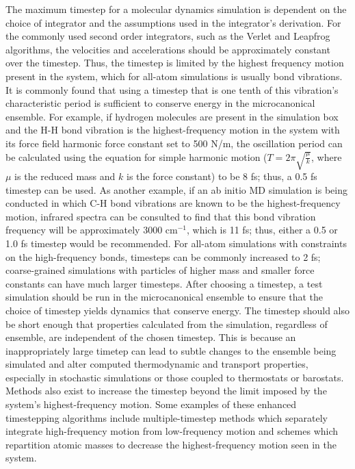 \documentclass[9pt,bestpractices]{livecoms}
\begin{document}
The maximum timestep for a molecular dynamics simulation is dependent on the choice of integrator and the assumptions used in the integrator's derivation.
For the commonly used second order integrators, such as the Verlet and Leapfrog algorithms, the velocities and accelerations should be approximately constant over the timestep.
Thus, the timestep is limited by the highest frequency motion present in the system, which for all-atom simulations is usually bond vibrations.
It is commonly found that using a timestep that is one tenth of this vibration's characteristic period is sufficient to conserve energy in the microcanonical ensemble.
For example, if hydrogen molecules are present in the simulation box and the H-H bond vibration is the highest-frequency motion in the system with its force field harmonic force constant set to 500 N/m, the oscillation period can be calculated using the equation for simple harmonic motion ($T=2\pi\sqrt{\frac{\mu}{k}}$, where $\mu$ is the reduced mass and $k$ is the force constant) to be 8 fs; thus, a 0.5 fs timestep can be used.
As another example, if an ab initio MD simulation is being conducted in which C-H bond vibrations are known to be the highest-frequency motion, infrared spectra can be consulted to find that this bond vibration frequency will be approximately 3000 cm$^{-1}$, which is 11 fs; thus, either a 0.5 or 1.0 fs timestep would be recommended.
For all-atom simulations with constraints on the high-frequency bonds, timesteps can be commonly increased to 2 fs; coarse-grained simulations with particles of higher mass and smaller force constants can have much larger timesteps.
After choosing a timestep, a test simulation should be run in the microcanonical ensemble to ensure that the choice of timestep yields dynamics that conserve energy.
The timestep should also be short enough that properties calculated from the simulation, regardless of ensemble, are independent of the chosen timestep.
This is because an inappropriately large timetep can lead to subtle changes to the ensemble being simulated and alter computed thermodynamic and transport properties, especially in stochastic simulations or those coupled to thermostats or barostats.
Methods also exist to increase the timestep beyond the limit imposed by the system's highest-frequency motion.
Some examples of these enhanced timestepping algorithms include multiple-timestep methods which separately integrate high-frequency motion from low-frequency motion and schemes which repartition atomic masses to decrease the highest-frequency motion seen in the system\cite{Berne:1999:Molecular,Hopkins:2015:JCTC:Long}.
\end{document}
